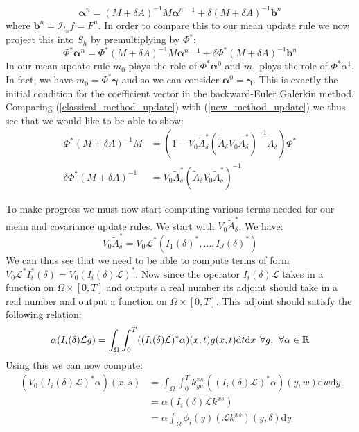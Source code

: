 \documentclass{article}
\theoremstyle{definition}
\theoremstyle{remark}
\theoremstyle{remark}
\begin{document}
\begin{equation}
    \boldsymbol{\alpha}^{n}=(M+\delta A)^{-1}M\boldsymbol{\alpha}^{n-1}+\delta(M+\delta A)^{-1}\mathbf{b}^{n}
\end{equation}
where $\mathbf{b}^{n}=\mathcal{I}_{t_n}f=F^{n}$. In order to compare this to our mean update rule we now project this into $S_{h}$ by premultiplying by $\Phi^{*}$:
\begin{equation}
    \label{classical_method_update}
    \Phi^{*}\boldsymbol{\alpha}^{n}=\Phi^{*}(M+\delta A)^{-1}M\boldsymbol{\alpha}^{n-1}+\delta\Phi^{*}(M+\delta A)^{-1}\mathbf{b}^{n}
\end{equation}
In our mean update rule $m_{0}$ plays the role of $\Phi^{*}\boldsymbol{\alpha}^{0}$ and $m_{1}$ plays the role of $\Phi^{*}\alpha^{1}$. In fact, we have $m_{0}=\Phi^{*}\boldsymbol{\gamma}$ and so we can consider $\boldsymbol{\alpha}^{0}=\boldsymbol{\gamma}$. This is exactly the initial condition for the coefficient vector in the backward-Euler Galerkin method. Comparing (\ref{classical_method_update}) with (\ref{new_method_update}) we thus see that we would like to be able to show:
\begin{align}
    \Phi^{*}(M+\delta A)^{-1}M &= \left(1-V_{0}\tilde{A}_{\delta}^{*}(\tilde{A}_{\delta}V_{0}\tilde{A}_{\delta}^{*})^{-1}\tilde{A}_{\delta}\right)\Phi^{*} \\
    \delta\Phi^{*}(M+\delta A)^{-1} &= V_{0}\tilde{A}_{\delta}^{*}(\tilde{A}_{\delta}V_{0}\tilde{A}_{\delta}^{*})^{-1}
\end{align}

To make progress we must now start computing various terms needed for our mean and covariance update rules. We start with $V_{0}\tilde{A}_{\delta}^{*}$. We have:
\begin{equation*}
    V_{0}\tilde{A}_{\delta}^{*}=V_{0}\mathcal{L}^{*}(I_{1}(\delta)^{*},\dots,I_{J}(\delta)^{*})
\end{equation*}
We can thus see that we need to be able to compute terms of form $V_{0}\mathcal{L}^{*}I_{i}^{*}(\delta)=V_{0}(I_{i}(\delta)\mathcal{L})^{*}$. Now since the operator $I_{i}(\delta)\mathcal{L}$ takes in a function on $\Omega\times[0,T]$ and outputs a real number its adjoint should take in a real number and output a function on $\Omega\times[0,T]$. This adjoint should satisfy the following relation:
\begin{equation}
    \alpha(I_{i}(\delta)\mathcal{L}g)=\int_{\Omega}\int_{0}^{T}((I_{i}(\delta)\mathcal{L})^{*}\alpha)(x,t)g(x,t)\mathrm{d}t\mathrm{d}x \hspace{0.15cm} \forall{g}, \hspace{0.15cm} \forall\alpha\in\mathbb{R}
\end{equation}
Using this we can now compute:
\begin{align*}
    (V_{0}(I_{i}(\delta)\mathcal{L})^{*}\alpha)(x,s) &= \int_{\Omega}\int_{0}^{T}k_{yw}^{xs}((I_{i}(\delta)\mathcal{L})^{*}\alpha)(y,w)\mathrm{d}w\mathrm{d}y \\
    &=\alpha (I_{i}(\delta)\mathcal{L}k^{xs}) \\
    &=\alpha\int_{\Omega}\phi_{i}(y)(\mathcal{L}k^{xs})(y,\delta)\mathrm{d}y
\end{align*}
\end{document}
